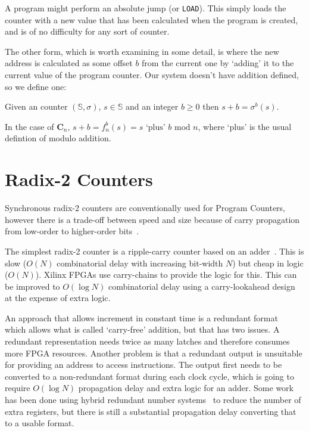 \documentclass[5p, twocolumn]{elsarticle}
\begin{document}
A program might perform an absolute jump (or \verb+LOAD+). This simply loads the counter with a new value that has been calculated when the program is created, and is of no difficulty for any sort of counter.

The other form, which is worth examining in some detail, is where the new address is calculated as some offset $b$ from the current one by `adding' it to the current value of the program counter. Our system doesn't have addition defined, so we define one:

\begin{definition}
Given an counter $(\mathbb{S},\sigma)$, $s\in\mathbb{S}$ and an integer $b\geq 0$ then $s+b=\sigma^b(s)$.
\end{definition}

In the case of $\mathbf{C}_n$, $s+b=f_n^b(s)=s\text{ `plus' }b\text{ mod }n$, where `plus' is the usual defintion of modulo addition.

\section{Radix-2 Counters}
\label{radix2_counters}

Synchronous radix-2 counters are conventionally used for Program Counters,
however there is a trade-off between speed and size because of carry propagation
from low-order to higher-order bits~\cite{stan1998laf}.

The simplest radix-2 counter is a ripple-carry counter based on an
adder~\cite{stan1998laf}. This is slow ($O(N)$ combinatorial delay with
increasing bit-width $N$) but cheap in logic ($O(N)$). Xilinx FPGAs use
carry-chains to provide the logic for this. This can be improved to $O(\log N)$
combinatorial delay using a carry-lookahead design~\cite{parhami2000computer} at
the expense of extra logic.

An approach that allows increment in constant time is a redundant
format~\cite{parhami-systolic} which allows what is called `carry-free' addition,
but that has two issues. A redundant representation needs twice as many latches
and therefore consumes more FPGA resources. Another problem is that a redundant
output is unsuitable for providing an address to access instructions. The output
first needs to be converted to a non-redundant format during each clock cycle,
which is going to require $O(\log N)$ propagation delay and extra logic for an
adder. Some work has been done using hybrid redundant number
systems~\cite{phatak1994hybrid} to reduce the number of extra registers, but
there is still a substantial propagation delay converting that to a usable
format.
\end{document}
